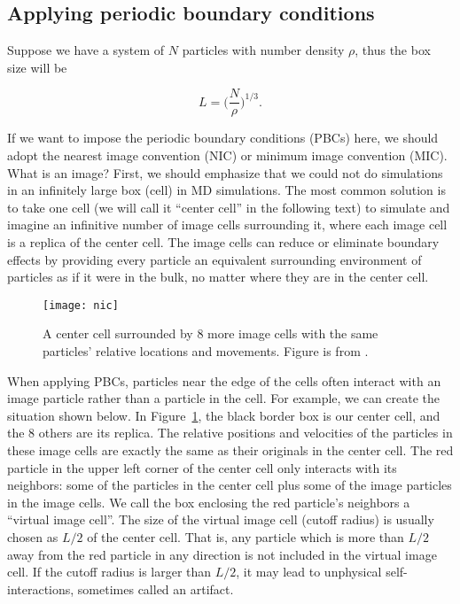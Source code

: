 \subsection{Applying periodic boundary conditions}

Suppose we have a system of $N$ particles with number density $\rho$, thus the
box size will be

\begin{equation}
    L = \bigg( \frac{ N }{ \rho } \bigg)^{1 / 3}.
\end{equation}

If we want to impose the periodic boundary conditions (PBCs) here, we should adopt the
nearest image convention (NIC) or minimum image convention (MIC). What is an image? First,
we should emphasize that we could not do simulations in an infinitely large box (cell) in MD
simulations. The most common solution is to take one cell (we will call it ``center cell''
in the following text) to simulate and imagine an infinitive number of image cells
surrounding it, where each image cell is a replica of the center cell. The image cells can
reduce or eliminate boundary effects by providing every particle an equivalent surrounding
environment of particles as if it were in the bulk, no matter where they are in the center
cell.

\begin{figure}[h]
    \centering
    \texttt{[image: nic]}
    \caption{A center cell surrounded by $8$ more image cells with the same
        particles' relative locations and movements. Figure is from \cite{matlab}.}
    \label{fig:nic}
\end{figure}

When applying PBCs, particles near the edge of the cells often interact
with an image particle rather than a particle in the cell. For example, we can create the
situation shown below.
In Figure~\ref{fig:nic}, the black border box is our center cell, and the $8$ others are
its replica. The relative positions and velocities of the particles in these image cells
are exactly the same as their originals in the center cell. The red particle in the
upper left corner of the center cell only interacts with its neighbors: some of the
particles in the center cell plus some of the image particles in the image cells.
We call the box enclosing the red particle's neighbors a ``virtual image cell''.
The size of the virtual image cell (cutoff radius) is usually chosen as $L / 2$
of the center cell. That is, any particle which is more than $L / 2$ away from the
red particle in any direction is not included in the virtual image cell.
If the cutoff radius is larger than $L / 2$, it may lead to
unphysical self-interactions, sometimes called an artifact.


